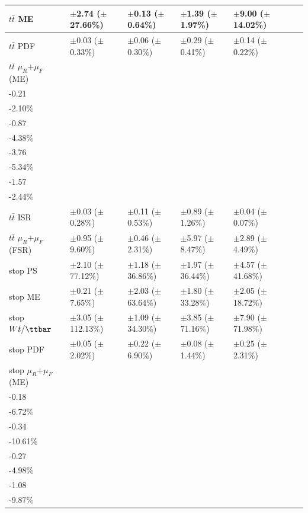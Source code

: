 \begin{table}[ht]
{\begin{tabular}{l l l l l l l }
\midrule
\(t\bar{t}\) ME & \(\pm\)2.74 (\(\pm\)27.66\%) &\(\pm\)0.13 (\(\pm\)0.64\%) &\(\pm\)1.39 (\(\pm\)1.97\%) &\(\pm\)9.00 (\(\pm\)14.02\%) \tabularnewline
\midrule
\(t\bar{t}\) PDF & \(\pm\)0.03 (\(\pm\)0.33\%) &\(\pm\)0.06 (\(\pm\)0.30\%) &\(\pm\)0.29 (\(\pm\)0.41\%) &\(\pm\)0.14 (\(\pm\)0.22\%) \tabularnewline
\midrule
\(t\bar{t}\) \(\mu_R\)+\(\mu_F\) (ME) & \(\substack{+0.28\\-0.21}\) \big(\(\substack{+2.83\%\\-2.10\%}\)\big) & \(\substack{+1.27\\-0.87}\) \big(\(\substack{+6.35\%\\-4.38\%}\)\big) & \(\substack{+2.42\\-3.76}\) \big(\(\substack{+3.44\%\\-5.34\%}\)\big) & \(\substack{+0.98\\-1.57}\) \big(\(\substack{+1.52\%\\-2.44\%}\)\big) \tabularnewline
\midrule
\(t\bar{t}\) ISR & \(\pm\)0.03 (\(\pm\)0.28\%) &\(\pm\)0.11 (\(\pm\)0.53\%) &\(\pm\)0.89 (\(\pm\)1.26\%) &\(\pm\)0.04 (\(\pm\)0.07\%) \tabularnewline
\midrule
\(t\bar{t}\) \(\mu_R\)+\(\mu_F\) (FSR) & \(\pm\)0.95 (\(\pm\)9.60\%) &\(\pm\)0.46 (\(\pm\)2.31\%) &\(\pm\)5.97 (\(\pm\)8.47\%) &\(\pm\)2.89 (\(\pm\)4.49\%) \tabularnewline
\midrule
stop PS & \(\pm\)2.10 (\(\pm\)77.12\%) &\(\pm\)1.18 (\(\pm\)36.86\%) &\(\pm\)1.97 (\(\pm\)36.44\%) &\(\pm\)4.57 (\(\pm\)41.68\%) \tabularnewline
\midrule
stop ME & \(\pm\)0.21 (\(\pm\)7.65\%) &\(\pm\)2.03 (\(\pm\)63.64\%) &\(\pm\)1.80 (\(\pm\)33.28\%) &\(\pm\)2.05 (\(\pm\)18.72\%) \tabularnewline
\midrule
stop \(Wt/\ttbar\) & \(\pm\)3.05 (\(\pm\)112.13\%) &\(\pm\)1.09 (\(\pm\)34.30\%) &\(\pm\)3.85 (\(\pm\)71.16\%) &\(\pm\)7.90 (\(\pm\)71.98\%) \tabularnewline
\midrule
stop PDF & \(\pm\)0.05 (\(\pm\)2.02\%) &\(\pm\)0.22 (\(\pm\)6.90\%) &\(\pm\)0.08 (\(\pm\)1.44\%) &\(\pm\)0.25 (\(\pm\)2.31\%) \tabularnewline
\midrule
stop \(\mu_R\)+\(\mu_F\) (ME) & \(\substack{+0.25\\-0.18}\) \big(\(\substack{+9.08\%\\-6.72\%}\)\big) & \(\substack{+0.48\\-0.34}\) \big(\(\substack{+14.99\%\\-10.61\%}\)\big) & \(\substack{+0.37\\-0.27}\) \big(\(\substack{+6.89\%\\-4.98\%}\)\big) & \(\substack{+1.58\\-1.08}\) \big(\(\substack{+14.44\%\\-9.87\%}\)\big) \tabularnewline

\end{tabular}}
\end{table}
